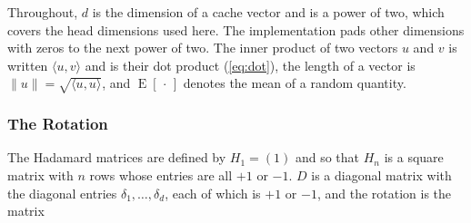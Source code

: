Throughout, $d$ is the dimension of a cache vector and is a power of two,
which covers the head dimensions used here. The implementation pads other
dimensions with zeros to the next power of two. The inner product of two
vectors $u$ and $v$ is written $\langle u, v \rangle$ and is their dot
product (\cref{eq:dot}), the length of a vector is
$\lVert u \rVert = \sqrt{\langle u, u \rangle}$, and
$\operatorname{E}[\,\cdot\,]$ denotes the mean of a random quantity.

\subsubsection{The Rotation}

The Hadamard matrices are defined by $H_1 = (1)$ and
so that $H_n$ is a square matrix with $n$ rows whose entries are all $+1$ or
$-1$. $D$ is a diagonal matrix with the diagonal entries
$\delta_1, \dots, \delta_d$, each of which is $+1$ or $-1$, and the rotation
is the matrix


